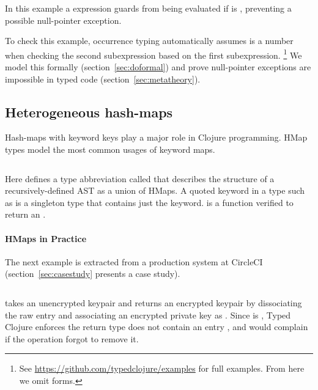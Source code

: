 In this example a  expression guards 
from being evaluated if  is , preventing
a possible null-pointer exception.

To check this example,
occurrence typing 
automatically
assumes
 is a number when checking the second  subexpression
based on the first subexpression.
\footnote{See \url{https://github.com/typedclojure/examples}
  for full examples. From here we omit  forms.}
We model this formally (section~\ref{sec:doformal}) and prove
null-pointer exceptions are impossible in typed code (section~\ref{sec:metatheory}).

\subsection{Heterogeneous hash-maps}

Hash-maps with keyword keys play a major role in Clojure programming.
HMap types model the most common usages of keyword maps.

\begin{exmp}
\inputminted[firstline=6,lastline=13]{clojure}{code/demo/src/demo/hmap.clj}
\label{example:decleaf}
\end{exmp}

Here  defines a type abbreviation called 
that describes the structure of a recursively-defined AST as a union of HMaps.
A quoted keyword in a type such as  is a singleton type that contains just the keyword.
 is a function verified to return an .

\paragraph{HMaps in Practice} The next example is extracted from a production system at CircleCI
(section~\ref{sec:casestudy} presents a case study).

\begin{exmp}
\inputminted[firstline=10,lastline=22]{clojure}{code/demo/src/demo/key.clj}
\label{example:circleci}
\end{exmp}

 takes an unencrypted keypair and returns an encrypted keypair by
dissociating the raw  entry and associating an encrypted private key
as .
Since  is , Typed Clojure enforces the return type
does not contain an entry , and would complain if the 
operation forgot to remove it.

